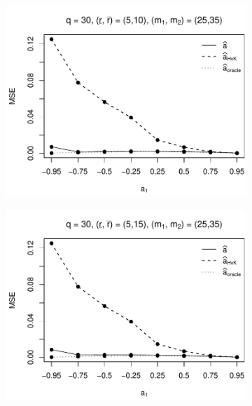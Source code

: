 \begin{figure}[p]
\begin{subfigure}[b]{0.45\textwidth}
\includegraphics[width=\textwidth]{Plots/Plots_Supplement/MSE_a_T=500_slope=10_(L1,L2,K1,K2,M1,M2)=(30,30,5,10,25,35).pdf}
\end{subfigure}
\hspace{0.25cm}
\begin{subfigure}[b]{0.45\textwidth}
\includegraphics[width=\textwidth]{Plots/Plots_Supplement/MSE_a_T=500_slope=10_(L1,L2,K1,K2,M1,M2)=(30,30,5,15,25,35).pdf}
\end{subfigure}


\end{figure}
